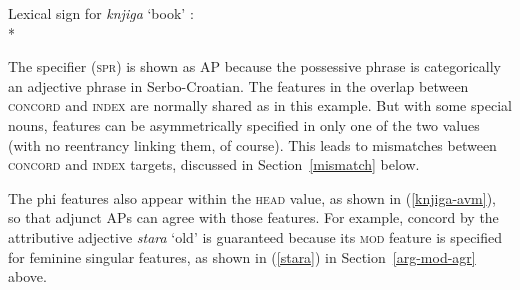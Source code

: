 \documentclass[output=paper
                ,modfonts
                ,nonflat
	        ,collection
	        ,collectionchapter
	        ,collectiontoclongg
 	        ,biblatex
                ,babelshorthands
                ,newtxmath
                ,draftmode
                ,colorlinks, citecolor=brown
]{./langsci/langscibook}
\begin{document}
{\eas
\label{knjiga-avm} Lexical sign for \emph{knjiga} `book' \citep[from][18]{Wechsler+Zlatic:2003}: \\*
\zs

\noindent
The specifier (\textsc{spr}) is shown as AP because the possessive phrase is categorically an adjective phrase in Serbo-Croatian.  The features in the overlap between \textsc{concord} and \textsc{index} are normally shared as in this example.  But with some special nouns, features can be asymmetrically specified in only one of the two values (with no reentrancy linking them, of course).  This leads to mismatches between \textsc{concord} and \textsc{index} targets, discussed in Section~\ref{mismatch} below.

The phi features also appear within the \textsc{head} value, as shown in (\ref{knjiga-avm}), so that adjunct APs can agree with those features.  For example, concord by the attributive adjective \textit{stara} `old' is guaranteed because its \textsc{mod} feature is specified for feminine singular features, as shown in (\ref{stara}) in Section~\ref{arg-mod-agr} above.   


}
\end{document}
